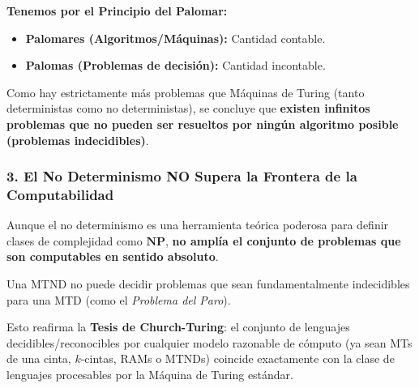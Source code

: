 \noindent \textbf{Tenemos por el Principio del Palomar:}
\begin{itemize}
    \item \textbf{Palomares (Algoritmos/Máquinas):} Cantidad contable.
    \item \textbf{Palomas (Problemas de decisión):} Cantidad incontable.
\end{itemize}

Como hay estrictamente más problemas que Máquinas de Turing (tanto deterministas como no deterministas), se concluye que \textbf{existen infinitos problemas que no pueden ser resueltos por ningún algoritmo posible (problemas indecidibles)}.

\subsubsection*{3. El No Determinismo NO Supera la Frontera de la Computabilidad}

Aunque el no determinismo es una herramienta teórica poderosa para definir clases de complejidad como $\mathbf{NP}$, \textbf{no amplía el conjunto de problemas que son computables en sentido absoluto}.

Una MTND no puede decidir problemas que sean fundamentalmente indecidibles para una MTD (como el \textit{Problema del Paro}).

Esto reafirma la \textbf{Tesis de Church-Turing}: el conjunto de lenguajes decidibles/reconocibles por cualquier modelo razonable de cómputo (ya sean MTs de una cinta, $k$-cintas, RAMs o MTNDs) coincide exactamente con la clase de lenguajes procesables por la Máquina de Turing estándar.
